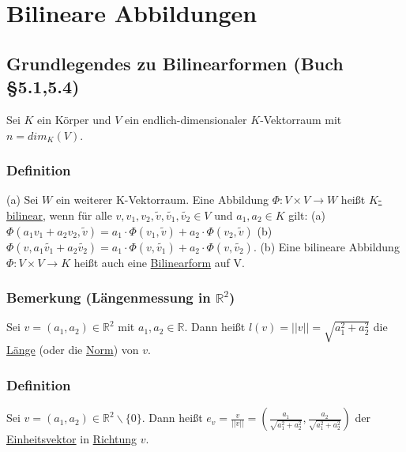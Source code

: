\documentclass[a4paper]{article}
\newcommand{\ul}{\underline}
\begin{document}
\section{Bilineare Abbildungen}
\setcounter{subsection}{24}
\subsection{Grundlegendes zu Bilinearformen (Buch §5.1,5.4)}
Sei \(K\) ein Körper und \(V\) ein endlich-dimensionaler \(K\)-Vektorraum mit \(n=dim_K(V)\).
\subsubsection{Definition}
(a) Sei \(W\) ein weiterer K-Vektorraum. Eine Abbildung \(\Phi:V\times V\rightarrow W\) heißt \ul{\(K\)-bilinear}, wenn für alle \(v,v_1,v_2,\tilde{v}, \tilde{v_1}, \tilde{v_2} \in V\) und \(a_1, a_2\in K\) gilt:
(a) \(\Phi(a_1v_1+a_2v_2,\tilde{v})=a_1\cdot\Phi(v_1,\tilde{v})+a_2\cdot\Phi(v_2,\tilde{v})\)
(b) \(\Phi(v,a_1\tilde{v_1}+a_2\tilde{v_2})=a_1\cdot\Phi(v,\tilde{v_1})+a_2\cdot\Phi(v,\tilde{v_2})\).
(b) Eine bilineare Abbildung \(\Phi:V\times V\rightarrow K\) heißt auch eine \ul{Bilinearform} auf V.
\subsubsection{Bemerkung (Längenmessung in \(\mathbb{R}^2\))}
Sei \(v=(a_1,a_2)\in\mathbb{R}^2\) mit \(a_1,a_2\in\mathbb{R}\). Dann heißt \(l(v)=||v|| = \sqrt{a_1^2+a_2^2}\) die \ul{Länge} (oder die \ul{Norm}) von \(v\).
\subsubsection{Definition}
Sei \(v=(a_1,a_2)\in\mathbb{R}^2\backslash\{0\}\). Dann heißt \(e_v=\frac{v}{||v||}=(\frac{a_1}{\sqrt{a_1^2+a_2^2}},\frac{a_2}{\sqrt{a_1^2+a_2^2}})\) der \ul{Einheitsvektor} in \ul{Richtung} \(v\).
\end{document}
